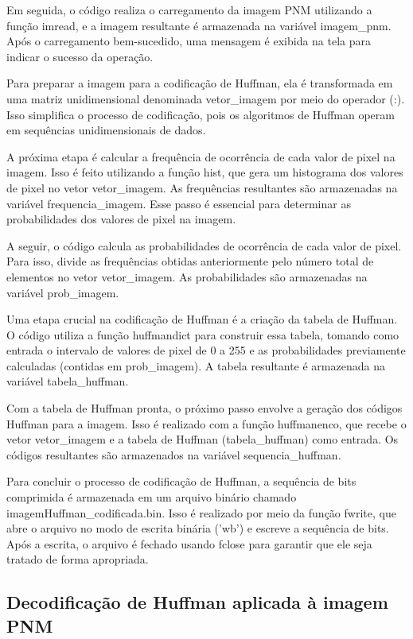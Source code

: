 \documentclass{article}
\begin{document}
Em seguida, o código realiza o carregamento da imagem PNM utilizando a função imread, e a imagem resultante é armazenada na variável imagem\_pnm. Após o carregamento bem-sucedido, uma mensagem é exibida na tela para indicar o sucesso da operação.

Para preparar a imagem para a codificação de Huffman, ela é transformada em uma matriz unidimensional denominada vetor\_imagem por meio do operador (:). Isso simplifica o processo de codificação, pois os algoritmos de Huffman operam em sequências unidimensionais de dados.

A próxima etapa é calcular a frequência de ocorrência de cada valor de pixel na imagem. Isso é feito utilizando a função hist, que gera um histograma dos valores de pixel no vetor vetor\_imagem. As frequências resultantes são armazenadas na variável frequencia\_imagem. Esse passo é essencial para determinar as probabilidades dos valores de pixel na imagem.

A seguir, o código calcula as probabilidades de ocorrência de cada valor de pixel. Para isso, divide as frequências obtidas anteriormente pelo número total de elementos no vetor vetor\_imagem. As probabilidades são armazenadas na variável prob\_imagem. 

Uma etapa crucial na codificação de Huffman é a criação da tabela de Huffman. O código utiliza a função huffmandict para construir essa tabela, tomando como entrada o intervalo de valores de pixel de 0 a 255 e as probabilidades previamente calculadas (contidas em prob\_imagem). A tabela resultante é armazenada na variável tabela\_huffman.

Com a tabela de Huffman pronta, o próximo passo envolve a geração dos códigos Huffman para a imagem. Isso é realizado com a função huffmanenco, que recebe o vetor vetor\_imagem e a tabela de Huffman (tabela\_huffman) como entrada. Os códigos resultantes são armazenados na variável sequencia\_huffman.

Para concluir o processo de codificação de Huffman, a sequência de bits comprimida é armazenada em um arquivo binário chamado imagemHuffman\_codificada.bin. Isso é realizado por meio da função fwrite, que abre o arquivo no modo de escrita binária ('wb') e escreve a sequência de bits. Após a escrita, o arquivo é fechado usando fclose para garantir que ele seja tratado de forma apropriada.

\subsection{Decodificação de Huffman aplicada à imagem PNM}
\end{document}
